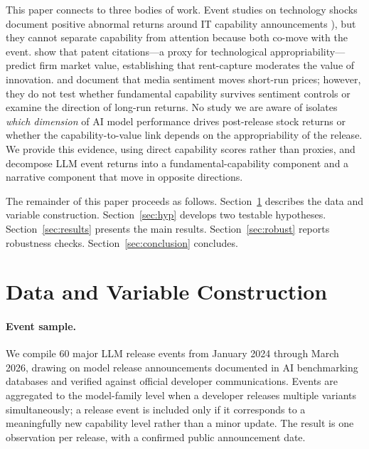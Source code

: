 \documentclass[12pt]{article}
\begin{document}
This paper connects to three bodies of work. Event studies on technology shocks
document positive abnormal returns around IT capability announcements
\citep[CITATION]{}), but they cannot separate capability from attention because
both co-move with the event. \citet{HallJaffeTrajtenberg2005} show that patent
citations---a proxy for technological appropriability---predict firm market value,
establishing that rent-capture moderates the value of innovation.
\citet{Tetlock2007} and \citet{EngelbergParsons2011} document that media sentiment
moves short-run prices; however, they do not test whether fundamental capability
survives sentiment controls or examine the direction of long-run returns. No study
we are aware of isolates \emph{which dimension} of AI model performance drives
post-release stock returns or whether the capability-to-value link depends on the
appropriability of the release. We provide this evidence, using direct capability
scores rather than proxies, and decompose LLM event returns into a
fundamental-capability component and a narrative component that move in opposite
directions.

The remainder of this paper proceeds as follows. Section~\ref{sec:data} describes
the data and variable construction. Section~\ref{sec:hyp} develops two testable
hypotheses. Section~\ref{sec:results} presents the main results.
Section~\ref{sec:robust} reports robustness checks. Section~\ref{sec:conclusion}
concludes.

\section{Data and Variable Construction}
\label{sec:data}

\paragraph{Event sample.}
We compile 60 major LLM release events from January 2024 through March 2026,
drawing on model release announcements documented in AI benchmarking databases
and verified against official developer communications. Events are aggregated to
the model-family level when a developer releases multiple variants simultaneously;
a release event is included only if it corresponds to a meaningfully new
capability level rather than a minor update. The result is one observation per
release, with a confirmed public announcement date.
\end{document}

